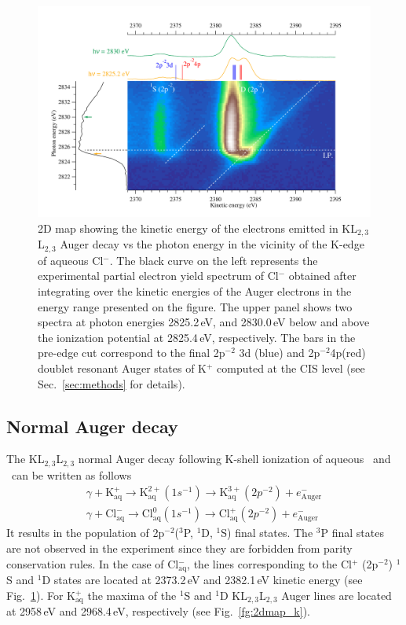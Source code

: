 \begin{figure}%
\centering
\includegraphics[scale=0.55]{figures/cl_2dmap.pdf}
\caption{2D map showing the kinetic energy of the electrons emitted in KL$_{2,3}$L$_{2,3}$ Auger decay vs the photon energy in the vicinity of the K-edge of aqueous Cl$^{-}$. The black curve on the left represents the experimental partial electron yield spectrum of Cl$^{-}$ obtained after integrating over the kinetic energies of the Auger electrons in the energy range presented on the figure. The upper panel shows two spectra at photon energies 2825.2\,eV, and 2830.0\,eV below and above the ionization potential at 2825.4\,eV, respectively. The bars in the pre-edge cut correspond to the final 2p$^{-2}$ 3d (blue) and 2p$^{-2}$4p(red) doublet resonant Auger states of K$^{+}$ computed at the CIS level (see Sec.\ \ref{sec:methods} for details).}
\label{fg:2dmap_cl}
\end{figure}


\subsection{Normal Auger decay}\label{ssec:na}

The KL$_{2,3}$L$_{2,3}$ normal Auger decay following K-shell ionization of aqueous \ki~and \cli~can be written as follows
%
\begin{align*}
\gamma + \text{K}^{+}_{\text{aq}} \rightarrow \text{K}^{2+}_{\text{aq}} (1s^{-1}) \rightarrow \text{K}^{3+}_{\text{aq}} (2p^{-2}) + e^{-}_{\text{Auger}}\\
\gamma + \text{Cl}^{-}_{\text{aq}} \rightarrow \text{Cl}^{0}_{\text{aq}} (1s^{-1}) \rightarrow \text{Cl}^{+}_{\text{aq}}(2p^{-2}) + e^{-}_{\text{Auger}}
\end{align*}
%
It results in the population of 2p$^{-2}$($^3$P, $^1$D, $^1$S) final states. The $^3$P final states are not observed in the experiment since they are forbidden from parity conservation rules. In the case of Cl$^{-}_{\text{aq}}$, the lines corresponding to the Cl$^{+}$ (2p$^{-2}$) $^1$S and $^1$D states are located at 2373.2\,eV and 2382.1\,eV kinetic energy (see Fig.\ \ref{fg:2dmap_cl}). For K$^{+}_{\text{aq}}$ the maxima of the $^1$S and $^1$D KL$_{2,3}$L$_{2,3}$ Auger lines are located at 2958\,eV and 2968.4\,eV, respectively (see Fig.\ \ref{fg:2dmap_k}). 


